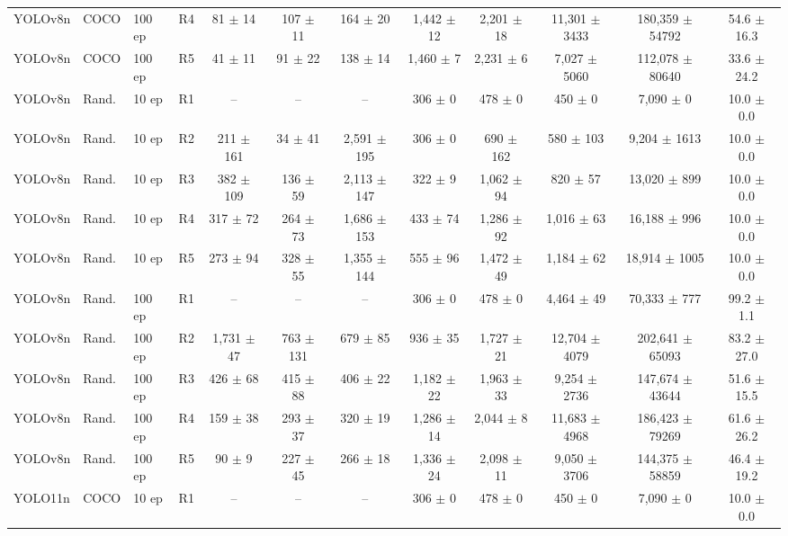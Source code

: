 \begin{table}[hbt!]
\begin{tabular}{lllccccccccc}
YOLOv8n & COCO & 100 ep & R4 & 81 $\pm$ 14 & 107 $\pm$ 11 & 164 $\pm$ 20 & 1,442 $\pm$ 12 & 2,201 $\pm$ 18 & 11,301 $\pm$ 3433 & 180,359 $\pm$ 54792 & 54.6 $\pm$ 16.3 \\
YOLOv8n & COCO & 100 ep & R5 & 41 $\pm$ 11 & 91 $\pm$ 22 & 138 $\pm$ 14 & 1,460 $\pm$ 7 & 2,231 $\pm$ 6 & 7,027 $\pm$ 5060 & 112,078 $\pm$ 80640 & 33.6 $\pm$ 24.2 \\
\midrule
YOLOv8n & Rand. & 10 ep & R1 & {--} & {--} & {--} & 306 $\pm$ 0 & 478 $\pm$ 0 & 450 $\pm$ 0 & 7,090 $\pm$ 0 & 10.0 $\pm$ 0.0 \\
YOLOv8n & Rand. & 10 ep & R2 & 211 $\pm$ 161 & 34 $\pm$ 41 & 2,591 $\pm$ 195 & 306 $\pm$ 0 & 690 $\pm$ 162 & 580 $\pm$ 103 & 9,204 $\pm$ 1613 & 10.0 $\pm$ 0.0 \\
YOLOv8n & Rand. & 10 ep & R3 & 382 $\pm$ 109 & 136 $\pm$ 59 & 2,113 $\pm$ 147 & 322 $\pm$ 9 & 1,062 $\pm$ 94 & 820 $\pm$ 57 & 13,020 $\pm$ 899 & 10.0 $\pm$ 0.0 \\
YOLOv8n & Rand. & 10 ep & R4 & 317 $\pm$ 72 & 264 $\pm$ 73 & 1,686 $\pm$ 153 & 433 $\pm$ 74 & 1,286 $\pm$ 92 & 1,016 $\pm$ 63 & 16,188 $\pm$ 996 & 10.0 $\pm$ 0.0 \\
YOLOv8n & Rand. & 10 ep & R5 & 273 $\pm$ 94 & 328 $\pm$ 55 & 1,355 $\pm$ 144 & 555 $\pm$ 96 & 1,472 $\pm$ 49 & 1,184 $\pm$ 62 & 18,914 $\pm$ 1005 & 10.0 $\pm$ 0.0 \\
\midrule
YOLOv8n & Rand. & 100 ep & R1 & {--} & {--} & {--} & 306 $\pm$ 0 & 478 $\pm$ 0 & 4,464 $\pm$ 49 & 70,333 $\pm$ 777 & 99.2 $\pm$ 1.1 \\
YOLOv8n & Rand. & 100 ep & R2 & 1,731 $\pm$ 47 & 763 $\pm$ 131 & 679 $\pm$ 85 & 936 $\pm$ 35 & 1,727 $\pm$ 21 & 12,704 $\pm$ 4079 & 202,641 $\pm$ 65093 & 83.2 $\pm$ 27.0 \\
YOLOv8n & Rand. & 100 ep & R3 & 426 $\pm$ 68 & 415 $\pm$ 88 & 406 $\pm$ 22 & 1,182 $\pm$ 22 & 1,963 $\pm$ 33 & 9,254 $\pm$ 2736 & 147,674 $\pm$ 43644 & 51.6 $\pm$ 15.5 \\
YOLOv8n & Rand. & 100 ep & R4 & 159 $\pm$ 38 & 293 $\pm$ 37 & 320 $\pm$ 19 & 1,286 $\pm$ 14 & 2,044 $\pm$ 8 & 11,683 $\pm$ 4968 & 186,423 $\pm$ 79269 & 61.6 $\pm$ 26.2 \\
YOLOv8n & Rand. & 100 ep & R5 & 90 $\pm$ 9 & 227 $\pm$ 45 & 266 $\pm$ 18 & 1,336 $\pm$ 24 & 2,098 $\pm$ 11 & 9,050 $\pm$ 3706 & 144,375 $\pm$ 58859 & 46.4 $\pm$ 19.2 \\
\midrule
YOLO11n & COCO & 10 ep & R1 & {--} & {--} & {--} & 306 $\pm$ 0 & 478 $\pm$ 0 & 450 $\pm$ 0 & 7,090 $\pm$ 0 & 10.0 $\pm$ 0.0 \\

\end{tabular}
\end{table}
